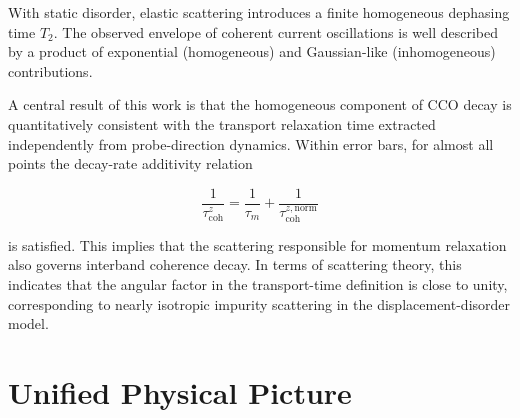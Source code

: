 With static disorder, elastic scattering introduces a finite homogeneous dephasing time $T_2$. The observed envelope of coherent current oscillations is well described by a product of exponential (homogeneous) and Gaussian-like (inhomogeneous) contributions. 

A central result of this work is that the homogeneous component of CCO decay is quantitatively consistent with the transport relaxation time extracted independently from probe-direction dynamics. Within error bars, for almost all points the decay-rate additivity relation

\begin{equation}
\frac{1}{\tau_{\mathrm{coh}}^z}
=
\frac{1}{\tau_m}
+
\frac{1}{\tau_{\mathrm{coh}}^{z,\mathrm{norm}}}
\end{equation}

is satisfied. This implies that the scattering responsible for momentum relaxation also governs interband coherence decay. In terms of scattering theory, this indicates that the angular factor in the transport-time definition is close to unity, corresponding to nearly isotropic impurity scattering in the displacement-disorder model.





\section*{Unified Physical Picture}

